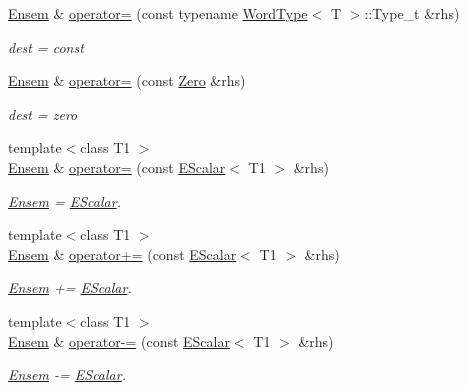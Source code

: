 \begin{DoxyCompactItemize}
\mbox{\hyperlink{classENSEM_1_1Ensem}{Ensem}} \& \mbox{\hyperlink{classENSEM_1_1Ensem_a1331b77ba6b10ddefa983e39976b4db6}{operator=}} (const typename \mbox{\hyperlink{structENSEM_1_1WordType}{Word\+Type}}$<$ T $>$\+::Type\+\_\+t \&rhs)
\begin{DoxyCompactList}\small\item\em dest = const \end{DoxyCompactList}\item 
\mbox{\hyperlink{classENSEM_1_1Ensem}{Ensem}} \& \mbox{\hyperlink{classENSEM_1_1Ensem_a55913bc59bca1022f5189cbc86632c11}{operator=}} (const \mbox{\hyperlink{structENSEM_1_1Zero}{Zero}} \&rhs)
\begin{DoxyCompactList}\small\item\em dest = zero \end{DoxyCompactList}\item 
{\footnotesize template$<$class T1 $>$ }\\\mbox{\hyperlink{classENSEM_1_1Ensem}{Ensem}} \& \mbox{\hyperlink{classENSEM_1_1Ensem_a376ab0239198595a09384c13d7a1ad1c}{operator=}} (const \mbox{\hyperlink{classENSEM_1_1EScalar}{E\+Scalar}}$<$ T1 $>$ \&rhs)
\begin{DoxyCompactList}\small\item\em \mbox{\hyperlink{classENSEM_1_1Ensem}{Ensem}} = \mbox{\hyperlink{classENSEM_1_1EScalar}{E\+Scalar}}. \end{DoxyCompactList}\item 
{\footnotesize template$<$class T1 $>$ }\\\mbox{\hyperlink{classENSEM_1_1Ensem}{Ensem}} \& \mbox{\hyperlink{classENSEM_1_1Ensem_a3b36653814508e90b22543a3f1b465d5}{operator+=}} (const \mbox{\hyperlink{classENSEM_1_1EScalar}{E\+Scalar}}$<$ T1 $>$ \&rhs)
\begin{DoxyCompactList}\small\item\em \mbox{\hyperlink{classENSEM_1_1Ensem}{Ensem}} += \mbox{\hyperlink{classENSEM_1_1EScalar}{E\+Scalar}}. \end{DoxyCompactList}\item 
{\footnotesize template$<$class T1 $>$ }\\\mbox{\hyperlink{classENSEM_1_1Ensem}{Ensem}} \& \mbox{\hyperlink{classENSEM_1_1Ensem_a33710df08404883ee7790d2b67542971}{operator-\/=}} (const \mbox{\hyperlink{classENSEM_1_1EScalar}{E\+Scalar}}$<$ T1 $>$ \&rhs)
\begin{DoxyCompactList}\small\item\em \mbox{\hyperlink{classENSEM_1_1Ensem}{Ensem}} -\/= \mbox{\hyperlink{classENSEM_1_1EScalar}{E\+Scalar}}. \end{DoxyCompactList}\item 

\end{DoxyCompactItemize}
